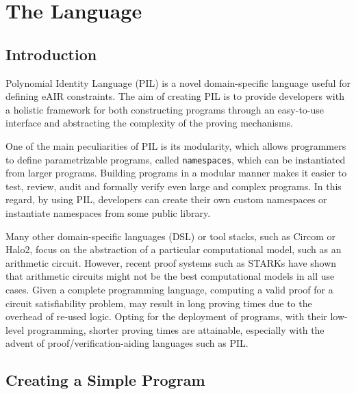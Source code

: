 \section{The Language}


\subsection{Introduction}

Polynomial Identity Language (PIL) is a novel domain-specific language useful for defining eAIR constraints. The aim of creating PIL is to provide developers with a holistic framework for both constructing programs through an easy-to-use interface and abstracting the complexity of the proving mechanisms.

One of the main peculiarities of PIL is its modularity, which allows programmers to define parametrizable programs, called \texttt{namespaces}, which can be instantiated from larger programs. Building programs in a modular manner makes it easier to test, review, audit and formally verify even large and complex programs. In this regard, by using PIL, developers can create their own custom namespaces or instantiate namespaces from some public library.

Many other domain-specific languages (DSL) or tool stacks, such as Circom or Halo2, focus on the abstraction of a particular computational model, such as an arithmetic circuit. However, recent proof systems such as STARKs have shown that arithmetic circuits might not be the best computational models in all use cases. Given a complete programming language, computing a valid proof for a circuit satisfiability problem, may result in long proving times due to the overhead of re-used logic. Opting for the deployment of programs, with their low-level programming, shorter proving times are attainable, especially with the advent of proof/verification-aiding languages such as PIL.









\subsection{Creating a Simple Program}\label{sec:simple-program}

